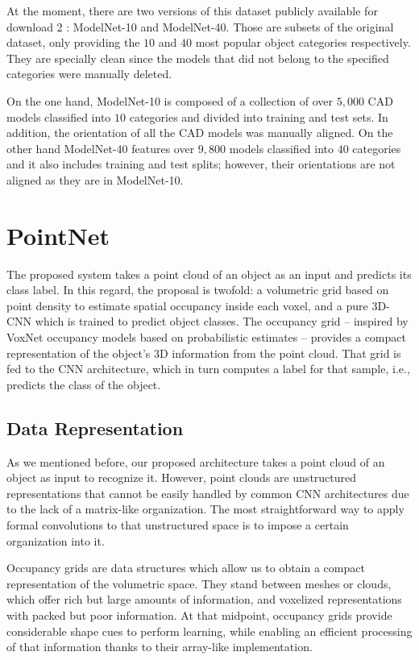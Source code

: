 At the moment, there are two versions of this dataset publicly available for download 2 : ModelNet-10 and ModelNet-40. Those are subsets of the original dataset, only providing the $10$ and $40$ most popular object categories respectively. They are specially clean since the models that did not belong to the specified categories were manually deleted.

On the one hand, ModelNet-10 is composed of a collection of over $5,000$ \ac{CAD} models classified into $10$ categories and divided into training and test sets. In addition, the orientation of all the \ac{CAD} models was manually aligned. On the other hand ModelNet-40 features over $9,800$ models classified into $40$ categories and it also includes training and test splits; however, their orientations are not aligned as they are in ModelNet-10.

\section{PointNet}
\label{cha:objrecog:sec:pointnet}

The proposed system takes a point cloud of an object as an input and predicts its class label. In this regard, the proposal is twofold: a volumetric grid based on point density to estimate spatial occupancy inside each voxel, and a pure \ac{3D}-\ac{CNN} which is trained to predict object classes. The occupancy grid -- inspired by VoxNet \cite{Maturana2015} occupancy models based on probabilistic estimates -- provides a compact representation of the object's 3D information from the point cloud. That grid is fed to the \ac{CNN} architecture, which in turn computes a label for that sample, i.e., predicts the class of the object.

\subsection{Data Representation}
\label{cha:objrecog:sec:pointnet:subsec:data}

As we mentioned before, our proposed architecture takes a point cloud of an object as input to recognize it. However, point clouds are unstructured representations that cannot be easily handled by common \ac{CNN} architectures due to the lack of a matrix-like organization. The most straightforward way to apply formal convolutions to that unstructured space is to impose a certain organization into it.

Occupancy grids are data structures which allow us to obtain a compact representation of the volumetric space. They stand between meshes or clouds, which offer rich but large amounts of information, and voxelized representations with packed but poor information. At that midpoint, occupancy grids provide considerable shape cues to perform learning, while enabling an efficient processing of that information thanks to their array-like implementation.

